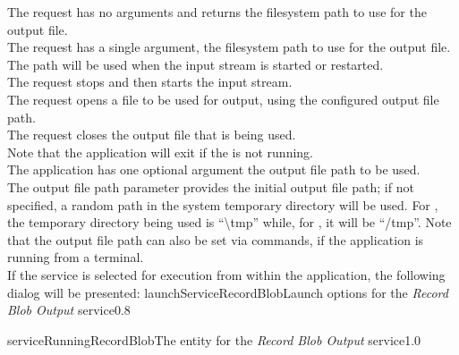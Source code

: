 The  request has no arguments and
returns the file\longDash{}system path to use for the output file.\\

The  request has a single argument,
the file\longDash{}system path to use for the output file.
The path will be used when the input stream is started or restarted.\\

The  request stops and then
starts the input stream.\\

The  request opens a file to be
used for output, using the configured output file path.\\

The  request closes the output
file that is being used.\\

Note that the application will exit if the  is not
running.\\

The application has one optional argument \longDash{} the output file path to be used.
\insertAppParameters
{}
\insertOutputServiceComment\\

The output file path parameter provides the initial output file path; if not specified, a
random path in the system temporary directory will be used.
For \win, the temporary directory being used is ``\textbackslash{}tmp'' while, for \osx{},
it will be ``/tmp''.
Note that the output file path can also be set via commands, if the application is
running from a terminal.\\

\insertStandardServiceCommands
\condPage
If the service is selected for execution from within the \emph{\MMMU} application, the
following dialog will be presented:
%
{launchServiceRecordBlob}{Launch options for the \emph{Record Blob Output} service}{0.8}

%
{serviceRunningRecordBlob}{The \emph{\MMMU} entity for the \emph{Record Blob Output}
service}{1.0}

